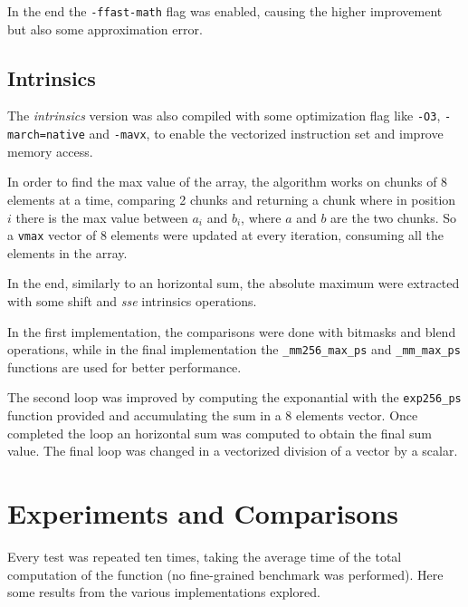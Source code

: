 \documentclass[12pt, a4paper]{article}
\begin{document}
In the end the \verb|-ffast-math| flag was enabled, causing the higher
improvement but also some approximation error.

\subsection{Intrinsics}

The \textit{intrinsics} version was also compiled with some optimization flag
like \verb|-O3|, \verb|-march=native| and \verb|-mavx|, to enable the vectorized
instruction set and improve memory access.

In order to find the max value of the array, the algorithm works on chunks of 8
elements at a time, comparing 2 chunks and returning a chunk where in position
$i$ there is the max value between $a_i$ and $b_i$, where $a$ and $b$ are the
two chunks. So a \verb|vmax| vector of 8 elements were updated at every
iteration, consuming all the elements in the array.

In the end, similarly to an horizontal sum, the absolute maximum were extracted
with some shift and \textit{sse} intrinsics operations.

In the first implementation, the comparisons were done with bitmasks and blend
operations, while in the final implementation the \verb|_mm256_max_ps| and
\verb|_mm_max_ps| functions are used for better performance.

The second loop was improved by computing the exponantial with the
\verb|exp256_ps| function provided and accumulating the sum in a 8 elements
vector. Once completed the loop an horizontal sum was computed to obtain the
final sum value. The final loop was changed in a vectorized division of a
vector by a scalar.

\section{Experiments and Comparisons}

Every test was repeated ten times, taking the average time of the total
computation of the function (no fine-grained benchmark was performed). Here
some results from the various implementations explored.
\end{document}
